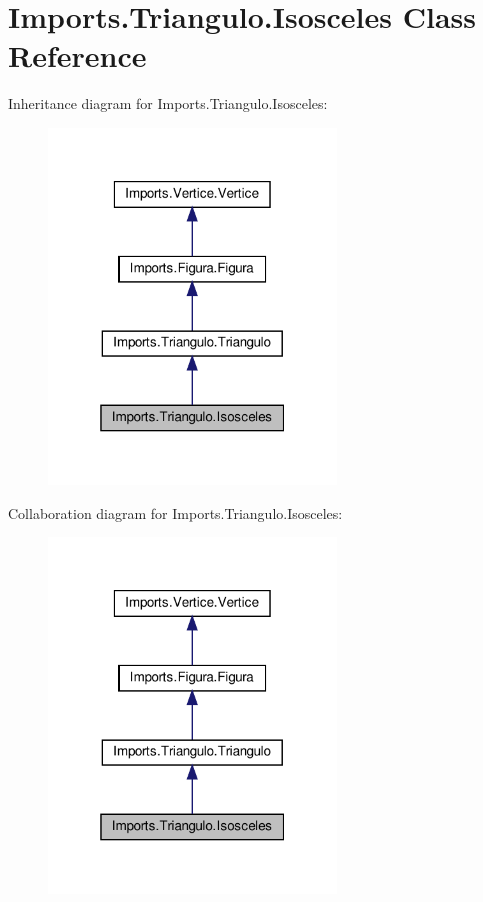 \hypertarget{class_imports_1_1_triangulo_1_1_isosceles}{}\section{Imports.\+Triangulo.\+Isosceles Class Reference}
\label{class_imports_1_1_triangulo_1_1_isosceles}


Inheritance diagram for Imports.\+Triangulo.\+Isosceles\+:
\nopagebreak
\begin{figure}[H]
\begin{center}
\leavevmode
\includegraphics[width=217pt]{class_imports_1_1_triangulo_1_1_isosceles__inherit__graph}
\end{center}
\end{figure}


Collaboration diagram for Imports.\+Triangulo.\+Isosceles\+:
\nopagebreak
\begin{figure}[H]
\begin{center}
\leavevmode
\includegraphics[width=217pt]{class_imports_1_1_triangulo_1_1_isosceles__coll__graph}
\end{center}
\end{figure}
